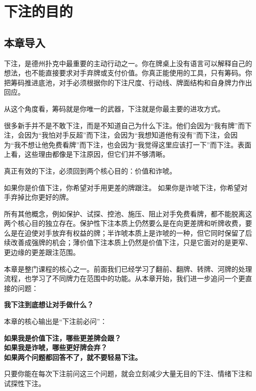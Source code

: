 \chapter{下注的目的}

\section{本章导入}

下注，是德州扑克中最重要的主动行动之一。你在牌桌上没有语言可以解释自己的想法，也不能直接要求对手弃牌或支付价值。你真正能使用的工具，只有筹码。你把筹码推进底池，对手必须根据你的下注尺度、行动线、牌面结构和自身牌力作出回应。

从这个角度看，筹码就是你唯一的武器，下注就是你最主要的进攻方式。

很多新手并不是不敢下注，而是不知道自己为什么下注。他们会因为“我有牌”而下注，会因为“我怕对手反超”而下注，会因为“我想知道他有没有”而下注，会因为“我不想让他免费看牌”而下注，也会因为“我觉得这里应该打一下”而下注。表面上看，这些理由都像是下注原因，但它们并不够清晰。

真正有效的下注，必须回到两个核心目的：价值和诈唬。

如果你是价值下注，你希望对手用更差的牌跟注。
如果你是诈唬下注，你希望对手弃掉比你更好的牌。

所有其他概念，例如保护、试探、控池、施压、阻止对手免费看牌，都不能脱离这两个核心目的独立存在。保护性下注本质上仍然要么是在向更差牌和听牌收费，要么是在迫使对手放弃有权益的牌；半诈唬本质上是诈唬的一种，但它同时保留了后续改善成强牌的机会；薄价值下注本质上仍然是价值下注，只是它面对的是更窄、更边缘的更差跟注范围。

本章是整门课程的核心之一。前面我们已经学习了翻前、翻牌、转牌、河牌的处理流程，也学习了不同牌力在范围中的功能。从本章开始，我们进一步追问一个更直接的问题：

\begin{center}
\textbf{我下注到底想让对手做什么？}
\end{center}

本章的核心输出是“下注前必问”：

\begin{center}
\textbf{如果我是价值下注，哪些更差牌会跟？\\
如果我是诈唬，哪些更好牌会弃？\\
如果两个问题都回答不了，就不要轻易下注。}
\end{center}

只要你能在每次下注前问这三个问题，就会立刻减少大量无目的下注、情绪下注和试探性下注。

